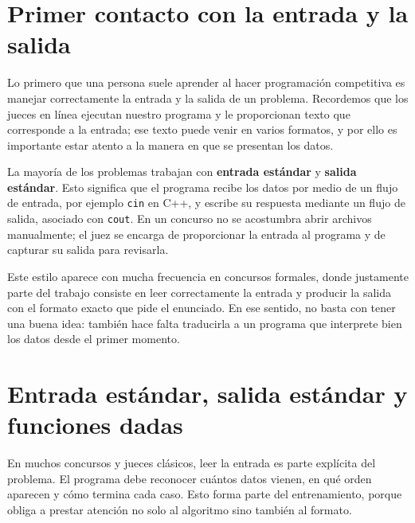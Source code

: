 \newcommand{\ioexample}[2]{%
\noindent
\begin{minipage}[t]{0.47\textwidth}
\raggedright
\textbf{Entrada ejemplo}

{\ttfamily #1}
\end{minipage}\hfill
\begin{minipage}[t]{0.47\textwidth}
\raggedright
\textbf{Salida ejemplo}

{\ttfamily #2}
\end{minipage}
\par\medskip
}

\section{Primer contacto con la entrada y la salida}

Lo primero que una persona suele aprender al hacer programación competitiva es manejar correctamente la entrada y la salida de un problema. Recordemos que los jueces en línea ejecutan nuestro programa y le proporcionan texto que corresponde a la entrada; ese texto puede venir en varios formatos, y por ello es importante estar atento a la manera en que se presentan los datos.

La mayoría de los problemas trabajan con \textbf{entrada estándar} y \textbf{salida estándar}. Esto significa que el programa recibe los datos por medio de un flujo de entrada, por ejemplo \texttt{cin} en C++, y escribe su respuesta mediante un flujo de salida, asociado con \texttt{cout}. En un concurso no se acostumbra abrir archivos manualmente; el juez se encarga de proporcionar la entrada al programa y de capturar su salida para revisarla.

Este estilo aparece con mucha frecuencia en concursos formales, donde justamente parte del trabajo consiste en leer correctamente la entrada y producir la salida con el formato exacto que pide el enunciado. En ese sentido, no basta con tener una buena idea: también hace falta traducirla a un programa que interprete bien los datos desde el primer momento.

\section{Entrada estándar, salida estándar y funciones dadas}

En muchos concursos y jueces clásicos, leer la entrada es parte explícita del problema. El programa debe reconocer cuántos datos vienen, en qué orden aparecen y cómo termina cada caso. Esto forma parte del entrenamiento, porque obliga a prestar atención no solo al algoritmo sino también al formato.

